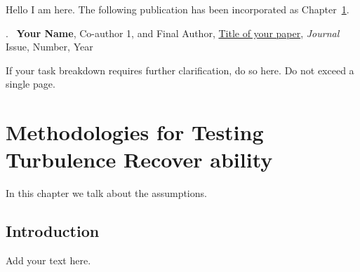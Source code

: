 \cleartoevenpage
\pagestyle{empty}	

\noindent
Hello I am here. The following publication has been incorporated as Chapter~\ref{Chap:interferometryChapter}.

.~\cite{DumyCitationKey} \textbf{Your Name}, Co-author 1, and Final Author, \href{linktoyourpaper}{Title of your paper}, \textit{Journal} Issue, Number, Year

If your task breakdown requires further clarification, do so here. Do not exceed a single page.


\chapter[Abbreviated title]{Methodologies for Testing Turbulence Recover ability}\label{Chap:interferometryChapter}	%
\pagestyle{headings}

In this chapter we talk about the assumptions.



\section{Introduction}\label{Chap:interferometryChapterExplain}	%

Add your text here. 

